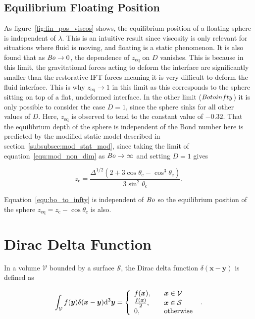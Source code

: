 \documentclass[12pt]{article}
\newcommand\Bo{\mbox{\textit{Bo}}}  %
\begin{document}
\subsection{Equilibrium Floating Position}
\label{subsec:dis_float_pos}

As figure~\ref{fig:fin_pos_viscos} shows, the equilibrium position of a floating sphere is independent of $\lambda$. This is an intuitive result since viscosity is only relevant for situations where fluid is moving, and floating is a static phenomenon. It is also found that as $\Bo \to 0$, the dependence of $z_{\text{eq}}$ on $D$ vanishes. This is because in this limit, the gravitational forces acting to deform the interface are significantly smaller than the restorative IFT forces meaning it is very difficult to deform the fluid interface. This is why $z_{\text{eq}} \to 1$ in this limit as this corresponds to the sphere sitting on top of a flat, undeformed interface. In the other limit ($\Bo to infty$) it is only possible to consider the case $D = 1$, since the sphere sinks for all other values of $D$. Here, $z_{\text{eq}}$ is observed to tend to the constant value of $-0.32$. That the equilibrium depth of the sphere is independent of the Bond number here is predicted by the modified static model described in section~\ref{subsubsec:mod_stat_mod}, since taking the limit of equation~\ref{equ:mod_non_dim} as $\Bo \to \infty$ and setting $D = 1$ gives

\begin{equation}
\label{equ:bo_to_infty}
z_{\text{c}} = \frac{\Delta^{1/2} (2 + 3 \cos \theta_{\text{c}} - \cos^{3} \theta_{\text{c}})}{3 \sin^{2} \theta_{\text{c}}}.
\end{equation}

Equation~\ref{equ:bo_to_infty} is independent of $\Bo$ so the equilibrium position of the sphere $z_{\text{eq}} = z_{\text{c}} - \cos \theta_{\text{c}}$ is also. 
\appendix

\section{Dirac Delta Function}
\label{app:delta}

In a volume $\mathcal{V}$ bounded by a surface $\mathcal{S}$, the Dirac delta function $\delta(\boldsymbol{x} - \boldsymbol{y})$ is defined as \citep{Riley06}

\begin{equation}
\label{equ:dirac}
\int_{\mathcal{V}} f(\boldsymbol{y}) \delta(\boldsymbol{x} - \boldsymbol{y}) \mathrm{d}^{3} \boldsymbol{y} = \left\{
    \begin{array}{l l}
      f(\boldsymbol{x}), &\quad \boldsymbol{x} \in \mathcal{V} \\
      \frac{f(\boldsymbol{x})}{2}, &\quad \boldsymbol{x} \in \mathcal{S} \\
      0, & \quad \text{otherwise}
\end{array}
\right.\ .
\end{equation}
\end{document}
